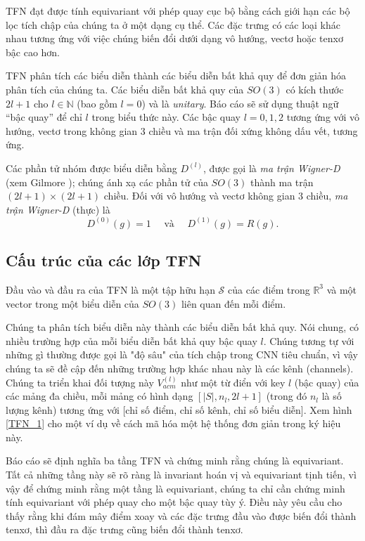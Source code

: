 TFN đạt được tính equivariant với phép quay cục bộ bằng cách giới hạn các bộ lọc tích chập của chúng ta ở một dạng cụ thể. Các
đặc trưng có các loại khác nhau tương ứng với việc chúng biến đổi dưới dạng vô hướng, vectơ hoặc tenxơ bậc cao hơn\cite{thomas2018tensorfieldnetworksrotation}. 

TFN phân tích các biểu diễn thành các biểu diễn bất khả quy để đơn giản hóa phân tích của chúng ta. Các biểu diễn
bất khả quy của $SO(3)$ có kích thước $2l+1$ cho $l \in \mathbb{N}$ (bao gồm $l=0$) và là \textit{unitary}. Báo cáo sẽ sử dụng thuật ngữ “bậc quay” để chỉ $l$ trong biểu thức này. Các bậc quay $l=0, 1, 2$  tương ứng với vô hướng, vectơ trong không gian 3 chiều và ma trận đối xứng không dấu vết, tương ứng.

Các phần tử nhóm được biểu diễn bằng $D^{(l)}$, được gọi là \textit{ma trận Wigner-D} (xem Gilmore \cite{gilmore2008lie}); chúng ánh xạ các phần tử của $SO(3)$ thành ma trận $(2l+1) \times (2l+1)$ chiều. Đối với vô hướng và vectơ không gian 3 chiều, \textit{ma trận Wigner-D} (thực) là
$$
D^{(0)}(g) = 1 \quad \text{ và } \quad D^{(1)}(g) = R(g).
$$

\subsection{Cấu trúc của các lớp TFN}
Đầu vào và đầu ra của TFN là một tập hữu hạn $\mathcal{S}$ của các điểm trong $\mathbb{R}^3$ và một vector trong một biểu diễn của $SO(3)$ liên quan đến mỗi điểm\cite{thomas2018tensorfieldnetworksrotation}.

Chúng ta phân tích biểu diễn này thành các biểu diễn bất khả quy. Nói chung, có nhiều trường hợp của mỗi biểu diễn bất khả quy bậc quay $l$. Chúng tương tự với những gì thường được gọi là "độ sâu" của tích chập trong CNN tiêu chuẩn, vì vậy chúng ta sẽ đề cập đến những trường hợp khác nhau này là các kênh (channels). Chúng ta triển khai đối tượng này $V^{(l)}_{acm}$ như một từ điển với key $l$ (bậc quay) của các mảng đa chiều, mỗi mảng có hình dạng $[|S|, n_l, 2l + 1]$ (trong đó $n_l$ là số lượng kênh) tương ứng với [chỉ số điểm, chỉ số kênh, chỉ số biểu diễn]. Xem hình \ref{TFN_1} cho một ví dụ về cách mã hóa một hệ thống đơn giản trong ký hiệu này.

Báo cáo sẽ định nghĩa ba tầng TFN và chứng minh rằng chúng là equivariant. Tất cả những tầng này sẽ rõ ràng là invariant hoán vị và equivariant tịnh tiến, vì vậy để chứng minh rằng một tầng là equivariant, chúng ta chỉ cần chứng minh tính equivariant với phép quay cho một bậc quay tùy ý. Điều này yêu cầu cho thấy rằng khi đám mây điểm xoay và các đặc trưng đầu vào được biến đổi thành tenxơ, thì đầu ra đặc trưng cũng biến đổi thành tenxơ. 


